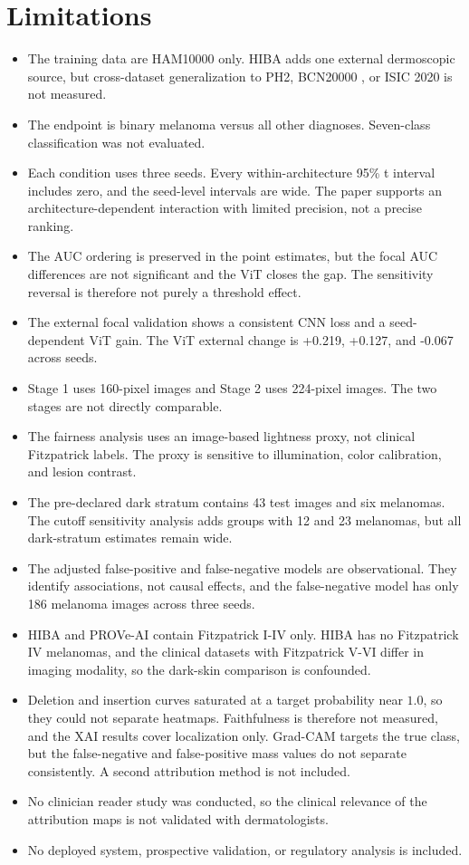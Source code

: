 \section{Limitations}

\begin{itemize}
  \item The training data are HAM10000 only. HIBA adds one external dermoscopic source, but cross-dataset generalization to PH2, BCN20000 \citep{combalia2019bcn20000}, or ISIC 2020 is not measured.
  \item The endpoint is binary melanoma versus all other diagnoses. Seven-class classification was not evaluated.
  \item Each condition uses three seeds. Every within-architecture 95\% t interval includes zero, and the seed-level intervals are wide. The paper supports an architecture-dependent interaction with limited precision, not a precise ranking.
  \item The AUC ordering is preserved in the point estimates, but the focal AUC differences are not significant and the ViT closes the gap. The sensitivity reversal is therefore not purely a threshold effect.
  \item The external focal validation shows a consistent CNN loss and a seed-dependent ViT gain. The ViT external change is +0.219, +0.127, and -0.067 across seeds.
  \item Stage 1 uses 160-pixel images and Stage 2 uses 224-pixel images. The two stages are not directly comparable.
  \item The fairness analysis uses an image-based lightness proxy, not clinical Fitzpatrick labels. The proxy is sensitive to illumination, color calibration, and lesion contrast.
  \item The pre-declared dark stratum contains 43 test images and six melanomas. The cutoff sensitivity analysis adds groups with 12 and 23 melanomas, but all dark-stratum estimates remain wide.
  \item The adjusted false-positive and false-negative models are observational. They identify associations, not causal effects, and the false-negative model has only 186 melanoma images across three seeds.
  \item HIBA and PROVe-AI contain Fitzpatrick I-IV only. HIBA has no Fitzpatrick IV melanomas, and the clinical datasets with Fitzpatrick V-VI differ in imaging modality, so the dark-skin comparison is confounded.
  \item Deletion and insertion curves saturated at a target probability near $1.0$, so they could not separate heatmaps. Faithfulness is therefore not measured, and the XAI results cover localization only. Grad-CAM targets the true class, but the false-negative and false-positive mass values do not separate consistently. A second attribution method is not included.
  \item No clinician reader study was conducted, so the clinical relevance of the attribution maps is not validated with dermatologists.
  \item No deployed system, prospective validation, or regulatory analysis is included.
\end{itemize}
